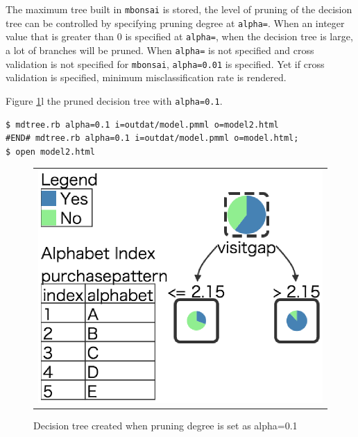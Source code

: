 The maximum tree built in \verb|mbonsai| is stored, the level of pruning of the decision tree can be controlled by specifying pruning degree at \verb|alpha=|. 
When an integer value that is greater than 0 is specified at \verb|alpha=|, when the decision tree is large, a lot of branches will be pruned. 
When \verb|alpha=| is not specified and cross validation is not specified for \verb|mbonsai|, \verb|alpha=0.01| is specified. Yet if cross validation is specified, minimum misclassification rate is rendered. 

Figure \ref{fig:mdtree_tree_2}l the pruned decision tree with \verb|alpha=0.1|. 

\begin{Verbatim}[baselinestretch=0.7,frame=single]
$ mdtree.rb alpha=0.1 i=outdat/model.pmml o=model2.html
#END# mdtree.rb alpha=0.1 i=outdat/model.pmml o=model.html;
$ open model2.html 
\end{Verbatim}

\begin{figure}[htbp]
\begin{center}
\begin{tabular}{c}

\begin{minipage}{0.5\hsize}
\begin{center}
\includegraphics[scale=0.5]{figure/tree_2.eps}
\caption{Decision tree created when pruning degree is set as alpha=0.1\label{fig:mdtree_tree_2}}
\end{center}
\end{minipage}

\end{tabular}
\end{center}
\end{figure}


